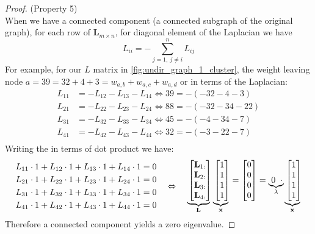 \documentclass[a4paper]{article}
\begin{document}
\begin{proof} (Property 5)\\
When we have a connected component (a connected subgraph of the original graph), for each row of $\textbf{L}_{m \times n}$, for diagonal element of the Laplacian we have 
\[
{{L}_{ii}}=-\sum\limits_{j=1,\ j\ne i}^{n}{{{L}_{ij}}}
\]
For example, for our $L$ matrix in \ref{fig:undir_graph_1_cluster}, the weight leaving node $a=39=32+4+3=w_{a,b} + w_{a,c} + w_{a,d}$ or in terms  of the Laplacian:
\[
\begin{split}
    L_{11} &= -L_{12} -L_{13} -L_{14} \Leftrightarrow 39 = -(-32-4-3)\\
    L_{21} &= -L_{22} -L_{23} -L_{24} \Leftrightarrow 88 = -(-32- 34-22)\\
    L_{31} &= -L_{32} -L_{33} -L_{34} \Leftrightarrow 45=-(-4-34-7)\\
    L_{41} &= -L_{42} -L_{43} -L_{44} \Leftrightarrow 32=-(-3-22-7)\\
\end{split}
\]
Writing the  in terms of dot product we have:
\[
\begin{aligned}[c]
    L_{11}\cdot 1 +L_{12}\cdot 1 +L_{13}\cdot 1 +L_{14}\cdot 1=0\\
    L_{21}\cdot 1 +L_{22}\cdot 1 +L_{23}\cdot 1 +L_{24}\cdot 1=0\\
    L_{31}\cdot 1 +L_{32}\cdot 1 +L_{33}\cdot 1 +L_{34}\cdot 1=0\\
    L_{41}\cdot 1 +L_{42}\cdot 1 +L_{43}\cdot 1 +L_{44}\cdot 1=0\\
\end{aligned}
\quad \Leftrightarrow \quad
\begin{aligned}[c]
    \myunderbrace{
    \begin{bmatrix}
        \textbf{L}_{1:}\\
        \textbf{L}_{2:}\\
        \textbf{L}_{3:}\\
        \textbf{L}_{4:}
    \end{bmatrix}
    }
    {\textbf{L}}
    \myunderbrace{
    \begin{bmatrix}
        1\\1\\1\\1
    \end{bmatrix}
    }{\textbf{x}}
    =
    \begin{bmatrix}
        0\\0\\0\\0
    \end{bmatrix}
    = \myunderbrace{\ 0\ }{\lambda} \cdot 
    \myunderbrace{
    \begin{bmatrix}
        1\\1\\1\\1
    \end{bmatrix}
    }
    {\textbf{x}}
\end{aligned}
\]
Therefore a connected component yields a zero eigenvalue. 
\end{proof}
\end{document}
